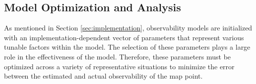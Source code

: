 \subsection{Model Optimization and Analysis}

As mentioned in Section \ref{sec:implementation}, observability models are initialized with an implementation-dependent vector of parameters that represent various tunable factors within the model. The selection of these parameters plays a large role in the effectiveness of the model. Therefore, these parameters must be optimized across a variety of representative situations to minimize the error between the estimated and actual observability of the map point. 

\subsubsection{}